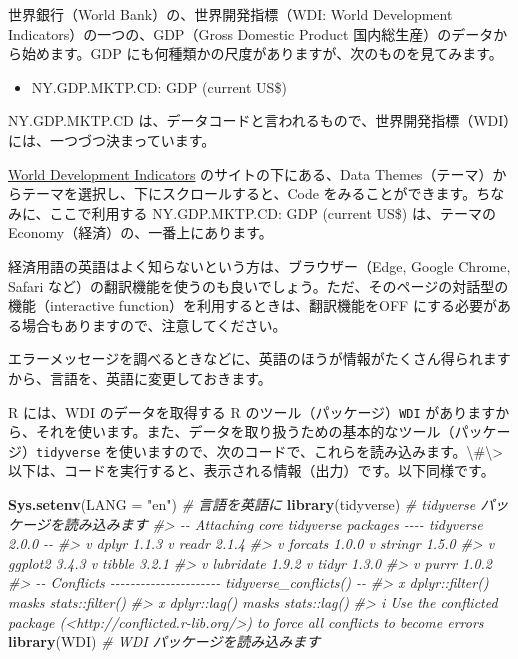 \documentclass[
  xelatex, ja=standard]{bxjsbook}
\newenvironment{Shaded}{\begin{snugshade}}{\end{snugshade}}
\newcommand{\AttributeTok}[1]{\textcolor[rgb]{0.13,0.29,0.53}{#1}}
\newcommand{\CommentTok}[1]{\textcolor[rgb]{0.56,0.35,0.01}{\textit{#1}}}
\newcommand{\FunctionTok}[1]{\textcolor[rgb]{0.13,0.29,0.53}{\textbf{#1}}}
\newcommand{\NormalTok}[1]{#1}
\newcommand{\StringTok}[1]{\textcolor[rgb]{0.31,0.60,0.02}{#1}}
\providecommand{\tightlist}{%
  \setlength{\itemsep}{0pt}\setlength{\parskip}{0pt}}
\theoremstyle{definition}
\theoremstyle{definition}
\theoremstyle{definition}
\theoremstyle{definition}
\theoremstyle{remark}
\begin{document}
世界銀行（World Bank）の、世界開発指標（WDI: World Development Indicators）の一つの、GDP（Gross Domestic Product 国内総生産）のデータから始めます。GDP にも何種類かの尺度がありますが、次のものを見てみます。

\begin{itemize}
\tightlist
\item
  NY.GDP.MKTP.CD: GDP (current US\$)
\end{itemize}

NY.GDP.MKTP.CD は、データコードと言われるもので、世界開発指標（WDI）には、一つづつ決まっています。

\href{https://datatopics.worldbank.org/world-development-indicators/}{World Development Indicators} のサイトの下にある、Data Themes（テーマ）からテーマを選択し、下にスクロールすると、Code をみることができます。ちなみに、ここで利用する NY.GDP.MKTP.CD: GDP (current US\$) は、テーマの Economy（経済）の、一番上にあります。

経済用語の英語はよく知らないという方は、ブラウザー（Edge, Google Chrome, Safari など）の翻訳機能を使うのも良いでしょう。ただ、そのページの対話型の機能（interactive function）を利用するときは、翻訳機能をOFF にする必要がある場合もありますので、注意してください。

エラーメッセージを調べるときなどに、英語のほうが情報がたくさん得られますから、言語を、英語に変更しておきます。

R には、WDI のデータを取得する R のツール（パッケージ）\texttt{WDI} がありますから、それを使います。また、データを取り扱うための基本的なツール（パッケージ）\texttt{tidyverse} を使いますので、次のコードで、これらを読み込みます。\textbackslash\#\textbackslash\textgreater{} 以下は、コードを実行すると、表示される情報（出力）です。以下同様です。

\begin{Shaded}
\begin{Highlighting}[]
\FunctionTok{Sys.setenv}\NormalTok{(}\AttributeTok{LANG =} \StringTok{"en"}\NormalTok{) }\CommentTok{\# 言語を英語に}
\FunctionTok{library}\NormalTok{(tidyverse)      }\CommentTok{\# tidyverse パッケージを読み込みます}
\CommentTok{\#\textgreater{} {-}{-} Attaching core tidyverse packages {-}{-}{-}{-} tidyverse 2.0.0 {-}{-}}
\CommentTok{\#\textgreater{} v dplyr     1.1.3     v readr     2.1.4}
\CommentTok{\#\textgreater{} v forcats   1.0.0     v stringr   1.5.0}
\CommentTok{\#\textgreater{} v ggplot2   3.4.3     v tibble    3.2.1}
\CommentTok{\#\textgreater{} v lubridate 1.9.2     v tidyr     1.3.0}
\CommentTok{\#\textgreater{} v purrr     1.0.2     }
\CommentTok{\#\textgreater{} {-}{-} Conflicts {-}{-}{-}{-}{-}{-}{-}{-}{-}{-}{-}{-}{-}{-}{-}{-}{-}{-}{-}{-}{-}{-} tidyverse\_conflicts() {-}{-}}
\CommentTok{\#\textgreater{} x dplyr::filter() masks stats::filter()}
\CommentTok{\#\textgreater{} x dplyr::lag()    masks stats::lag()}
\CommentTok{\#\textgreater{} i Use the conflicted package (\textless{}http://conflicted.r{-}lib.org/\textgreater{}) to force all conflicts to become errors}
\FunctionTok{library}\NormalTok{(WDI)            }\CommentTok{\# WDI パッケージを読み込みます}
\end{Highlighting}
\end{Shaded}
\end{document}
